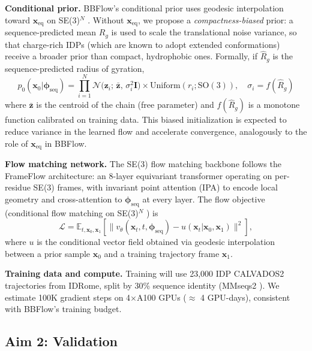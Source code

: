 \documentclass[12pt]{article}
\begin{document}
\noindent\textbf{Conditional prior.}
BBFlow's conditional prior uses geodesic interpolation toward $\mathbf{x}_\mathrm{eq}$ on
SE(3)$^N$ \cite{wolf2025bbflow}.
Without $\mathbf{x}_\mathrm{eq}$, we propose a \emph{compactness-biased} prior:
a sequence-predicted mean $R_g$ is used to scale the translational noise variance, so that
charge-rich IDPs (which are known to adopt extended conformations) receive a broader prior
than compact, hydrophobic ones.
Formally, if $\hat{R}_g$ is the sequence-predicted radius of gyration,
\begin{equation}
  p_0(\mathbf{x}_0 | \boldsymbol{\phi}_\mathrm{seq}) =
  \prod_{i=1}^{N}
    \mathcal{N}\bigl(\mathbf{z}_i;\, \bar{\mathbf{z}},\, \sigma_i^2 \mathbf{I}\bigr)
    \times \mathrm{Uniform}(r_i; \mathrm{SO}(3)),
  \quad \sigma_i = f(\hat{R}_g)
\end{equation}
where $\bar{\mathbf{z}}$ is the centroid of the chain (free parameter) and $f(\hat{R}_g)$
is a monotone function calibrated on training data.
This biased initialization is expected to reduce variance in the learned flow and accelerate
convergence, analogously to the role of $\mathbf{x}_\mathrm{eq}$ in BBFlow.

\noindent\textbf{Flow matching network.}
The SE(3) flow matching backbone follows the FrameFlow \cite{yim2023frameflow} architecture:
an 8-layer equivariant transformer operating on per-residue SE(3) frames, with
invariant point attention (IPA) to encode local geometry and cross-attention to
$\boldsymbol{\phi}_\mathrm{seq}$ at every layer.
The flow objective (conditional flow matching on SE(3)$^N$ \cite{lipman2023flow}) is
\begin{equation}
  \mathcal{L} = \mathbb{E}_{t, \mathbf{x}_0, \mathbf{x}_1}
    \left[\| v_\theta(\mathbf{x}_t, t, \boldsymbol{\phi}_\mathrm{seq})
             - u(\mathbf{x}_t | \mathbf{x}_0, \mathbf{x}_1) \|^2 \right],
\end{equation}
where $u$ is the conditional vector field obtained via geodesic interpolation between a
prior sample $\mathbf{x}_0$ and a training trajectory frame $\mathbf{x}_1$.

\noindent\textbf{Training data and compute.}
Training will use 23,000 IDP CALVADOS2 trajectories from IDRome, split by 30\% sequence
identity (MMseqs2 \cite{steinegger2017mmseqs2}).
We estimate 100K gradient steps on 4$\times$A100 GPUs ($\approx$ 4 GPU-days), consistent
with BBFlow's training budget.

\subsection{Aim 2: Validation}
\end{document}
